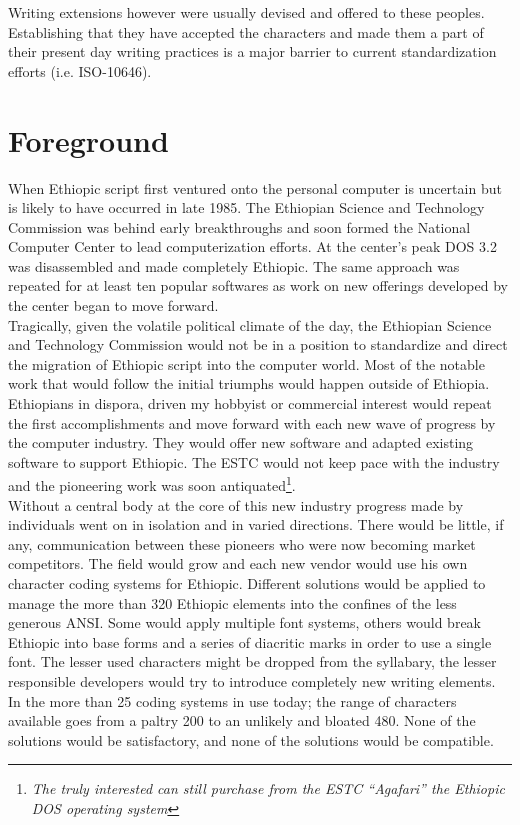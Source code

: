 Writing extensions however were usually devised and offered to these peoples.
Establishing that they have accepted the characters and made them a part of
their present day writing practices is a major barrier to current 
standardization efforts (i.e. ISO-10646).



\section*{Foreground}
When Ethiopic script first ventured onto the personal computer is uncertain but
is likely to have occurred in late 1985.  The Ethiopian Science and Technology
Commission was behind early breakthroughs and soon formed the National Computer
Center to
%
%
lead computerization efforts.  At the center's peak DOS 3.2 was disassembled and made
completely Ethiopic.  The same approach was repeated for at least ten popular
softwares as work on new offerings developed by the center began to move forward.\\

Tragically, given the volatile political climate of the day, the Ethiopian
Science and Technology Commission would not be in a position to standardize and
direct the migration of Ethiopic script into the computer world.  Most of the
notable work that would follow the initial triumphs would happen outside of
Ethiopia.  Ethiopians in dispora, driven my hobbyist or commercial interest
would repeat the first accomplishments and move forward with each new wave of
progress by the computer industry.  They would offer new software and adapted
existing software to support Ethiopic.  The ESTC would not keep pace with the
industry and the pioneering  work was soon antiquated\footnote{
\emph{The truly interested can still purchase from the ESTC ``Agafari'' the
Ethiopic DOS operating system}}.\\

Without a central body at the core of this new industry progress made by
individuals went on in isolation and in varied directions.  There would be
little, if any, communication between these pioneers who were now becoming
market competitors.  The field would grow and each new vendor would use his
own character coding systems for Ethiopic.  Different solutions would be
applied to manage the more than 320 Ethiopic elements into the confines of the
less generous ANSI.  Some would apply multiple font systems, others would break
Ethiopic into base forms and a series of diacritic marks in order to use
a single font.  The lesser used characters might be dropped from the syllabary,
the lesser responsible developers would try to introduce completely new
writing elements.  In the more than 25 coding systems in use today; the range
of characters available goes from a paltry 200 to an unlikely and bloated 480.
None of the solutions would be satisfactory, and none of the solutions would be
compatible.\\

